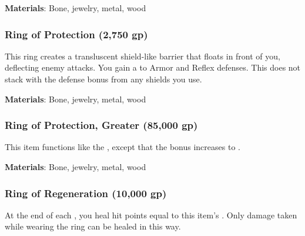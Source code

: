 \vspace{0.25em}
\textbf{Materials}: Bone, jewelry, metal, wood


\lowercase{\hypertarget{item:Ring of Protection}{}}\label{item:Ring of Protection}
\hypertarget{item:Ring of Protection}{\subsubsection{Ring of Protection\hfill{} (2,750 gp)}}

This ring creates a transluscent shield-like barrier that floats in front of you, deflecting enemy attacks.
You gain a   to Armor and Reflex defenses.
This does not stack with the defense bonus from any shields you use.



\vspace{0.25em}
\textbf{Materials}: Bone, jewelry, metal, wood


\lowercase{\hypertarget{item:Ring of Protection, Greater}{}}\label{item:Ring of Protection, Greater}
\hypertarget{item:Ring of Protection, Greater}{\subsubsection{Ring of Protection, Greater\hfill{} (85,000 gp)}}

This item functions like the , except that the bonus increases to .



\vspace{0.25em}
\textbf{Materials}: Bone, jewelry, metal, wood


\lowercase{\hypertarget{item:Ring of Regeneration}{}}\label{item:Ring of Regeneration}
\hypertarget{item:Ring of Regeneration}{\subsubsection{Ring of Regeneration\hfill{} (10,000 gp)}}

At the end of each , you heal hit points equal to this item's .
Only damage taken while wearing the ring can be healed in this way.



